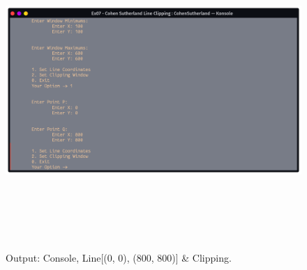 \documentclass[12pt, a4]{article}
\begin{document}
\subsection*{}
\begin{figure}[h]
\centering
\caption{Output: Console, Line[(0, 0), (800, 800)] \& Clipping.}
\includegraphics[height=12cm, width=17cm]{Outputs/Console-3.png}
\end{figure}

\newpage
\end{document}
